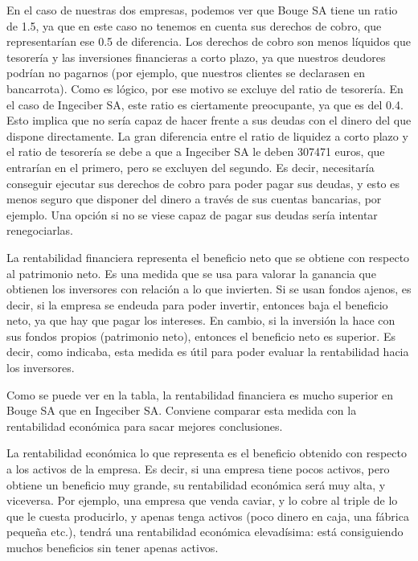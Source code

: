 \documentclass[a4paper]{article}
\begin{document}
En el caso de nuestras dos empresas, podemos ver que Bouge SA tiene un ratio de 1.5, ya que en este caso no tenemos en cuenta sus derechos de cobro, que representarían ese 0.5 de diferencia. Los derechos de cobro son menos líquidos que tesorería y las inversiones financieras a corto plazo, ya que nuestros deudores podrían no pagarnos (por ejemplo, que nuestros clientes se declarasen en bancarrota). Como es lógico, por ese motivo se excluye del ratio de tesorería. En el caso de Ingeciber SA, este ratio es ciertamente preocupante, ya que es del 0.4. Esto implica que no sería capaz de hacer frente a sus deudas con el dinero del que dispone directamente. La gran diferencia entre el ratio de liquidez a corto plazo y el ratio de tesorería se debe a que a Ingeciber SA le deben 307471 euros, que entrarían en el primero, pero se excluyen del segundo. Es decir, necesitaría conseguir ejecutar sus derechos de cobro para poder pagar sus deudas, y esto es menos seguro que disponer del dinero a través de sus cuentas bancarias, por ejemplo. Una opción si no se viese capaz de pagar sus deudas sería intentar renegociarlas.

La rentabilidad financiera representa el beneficio neto que se obtiene con respecto al patrimonio neto. Es una medida que se usa para valorar la ganancia que obtienen los inversores con relación a lo que invierten. Si se usan fondos ajenos, es decir, si la empresa se endeuda para poder invertir, entonces baja el beneficio neto, ya que hay que pagar los intereses. En cambio, si la inversión la hace con sus fondos propios (patrimonio neto), entonces el beneficio neto es superior. Es decir, como indicaba, esta medida es útil para poder evaluar la rentabilidad hacia los inversores.

Como se puede ver en la tabla, la rentabilidad financiera es mucho superior en Bouge SA que en Ingeciber SA. Conviene comparar esta medida con la rentabilidad económica para sacar mejores conclusiones.

La rentabilidad económica lo que representa es el beneficio obtenido con respecto a los activos de la empresa. Es decir, si una empresa tiene pocos activos, pero obtiene un beneficio muy grande, su rentabilidad económica será muy alta, y viceversa. Por ejemplo, una empresa que venda caviar, y lo cobre al triple de lo que le cuesta producirlo, y apenas tenga activos (poco dinero en caja, una fábrica pequeña etc.), tendrá una rentabilidad económica elevadísima: está consiguiendo muchos beneficios sin tener apenas activos.
\end{document}
